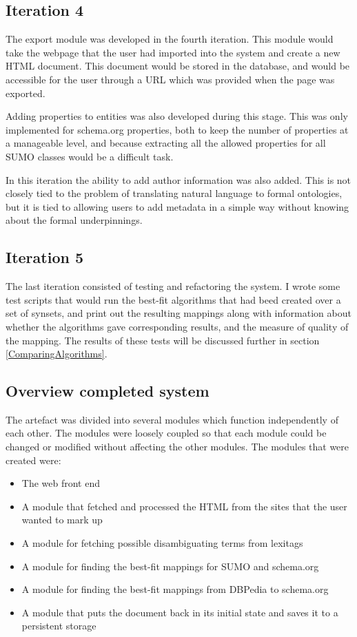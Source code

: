 \subsection{Iteration 4}
The export module was developed in the fourth iteration.
This module would take the webpage that the user had imported into the system and create a new HTML document.
This document would be stored in the database, and would be accessible for the user through a URL which was provided when the page was exported.

Adding properties to entities was also developed during this stage.
This was only implemented for schema.org properties,
both to keep the number of properties at a manageable level,
and because extracting all the allowed properties for all SUMO classes would be a difficult task.

In this iteration the ability to add author information was also added.
This is not closely tied to the problem of translating natural language to formal ontologies,
but it is tied to allowing users to add metadata in a simple way without knowing about the formal underpinnings.

\subsection{Iteration 5}
The last iteration consisted of testing and refactoring the system.
I wrote some test scripts that would run the best-fit algorithms that had beed created over a set of synsets,
and print out the resulting mappings along with information about whether the algorithms gave corresponding results,
and the measure of quality of the mapping.
The results of these tests will be discussed further in section \ref{ComparingAlgorithms}.

\subsection{Overview completed system}
The artefact was divided into several modules which function independently of each other.
The modules were loosely coupled so that each module could be changed or modified without affecting the other modules.
The modules that were created were:
\begin{itemize}
	\item The web front end
	\item A module that fetched and processed the HTML from the sites that the user wanted to mark up
	\item A module for fetching possible disambiguating terms from lexitags
	\item A module for finding the best-fit mappings for SUMO and schema.org
	\item A module for finding the best-fit mappings from DBPedia to schema.org
	\item A module that puts the document back in its initial state and saves it to a persistent storage
\end{itemize}

